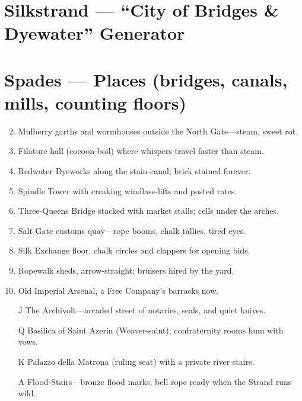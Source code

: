 \section{Silkstrand --- ``City of Bridges \& Dyewater'' Generator}
\label{chap:silkstrand}

\section*{Spades --- Places (bridges, canals, mills, counting floors)}
\label{sec:silkstrand-places}
\begin{enumerate}
\setcounter{enumi}{1}
\item Mulberry garths and wormhouses outside the North Gate---steam, sweet rot.
\item Filature hall (cocoon-boil) where whispers travel faster than steam.
\item Redwater Dyeworks along the stain-canal; brick stained forever.
\item Spindle Tower with creaking windlass-lifts and posted rates.
\item Three-Queens Bridge stacked with market stalls; cells under the arches.
\item Salt Gate customs quay---rope booms, chalk tallies, tired eyes.
\item Silk Exchange floor, chalk circles and clappers for opening bids.
\item Ropewalk sheds, arrow-straight; bruisers hired by the yard.
\item Old Imperial Arsenal, a Free Company's barracks now.
\item[J] The Archivolt---arcaded street of notaries, seals, and quiet knives.
\item[Q] Basilica of Saint Azerin (Weaver-saint); confraternity rooms hum with vows.
\item[K] Palazzo della Matrona (ruling seat) with a private river stairs.
\item[A] Flood-Stairs---bronze flood marks, bell rope ready when the Strand runs wild.
\end{enumerate}


